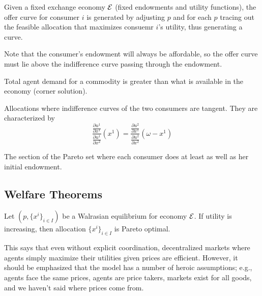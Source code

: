 \begin{definition}
  Given a fixed exchange economy ${\cal E}$ (fixed endowments and
  utility functions), the offer curve for consumer $i$ is generated by
  adjusting $p$ and for each $p$ tracing out the feasible allocation
  that maximizes consuemr $i$'s utility, thus generating a curve. 
\end{definition}

Note that the consumer's endowment will always be affordable, so the
offer curve must lie above the indifference curve passing through the
endowment.

\begin{definition}
  Total agent demand for a commodity is greater than what is available
  in the economy (corner solution).
\end{definition}

\begin{definition}
  Allocations where indifference curves of the two consumers are
  tangent. They are characterized by
  \[
  \frac{
    \frac{\partial u^1}{\partial x^1}
  } {
    \frac{\partial u^1}{\partial x^2}
  }
  (x^1)
  =
  \frac{
    \frac{\partial u^2}{\partial x^1}
  } {
    \frac{\partial u^2}{\partial x^2}
  } (\omega - x^1)
  \]
\end{definition}

\begin{definition}
  The section of the Pareto set where each consumer does at least as
  well as her initial endowment.
\end{definition}

\subsection{Welfare Theorems}
\label{sec:welfare-theorems}



\begin{theorem}
  Let $(p, \{x^i\}_{i \in I})$ be a Walrasian equilibrium for economy
  ${\cal E}$. If utility is increasing, then allocation $\{x^i\}_{i
    \in I}$ is Pareto optimal.
\end{theorem}

This says that even without explicit coordination, decentralized
markets where agents simply maximize their utilities given prices are
efficient. However, it should be emphasized that the model has a
number of heroic assumptions; e.g., agents face the same prices,
agents are price takers, markets exist for all goods, and we haven’t
said where prices come from.

